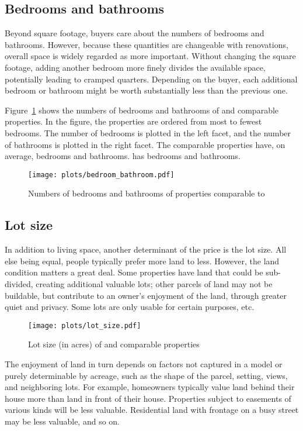 \documentclass[
12pt, %
letterpaper, %
oneside, %
headinclude,footinclude, %
BCOR5mm, %
]{scrartcl}
\begin{document}
\subsection{Bedrooms and bathrooms}
Beyond square footage, buyers care about the numbers of bedrooms and bathrooms.
However, because these quantities are changeable with renovations, overall space is widely regarded as more important.
Without changing the square footage, adding another bedroom more finely divides the available space, potentially leading to cramped quarters. 
Depending on the buyer, each additional bedroom or bathroom might be worth substantially less than the previous one.

Figure~\ref{fig:bedroom_bathroom} shows the numbers of bedrooms and bathrooms of \PropertyName{} and comparable properties. 
In the figure, the properties are ordered from most to fewest bedrooms.
The number of bedrooms is plotted in the left facet, and the number of bathrooms is plotted in the right facet. 
The comparable properties have, on average, \AverageBedrooms{} bedrooms and \AverageBaths{} bathrooms.
\PropertyName{} has bedrooms \NumberOfBedrooms{} and \NumberOfBaths{} bathrooms.

\begin{figure}[!]
\centering
\caption{Numbers of bedrooms and bathrooms of properties comparable to \PropertyName{}} \label{fig:bedroom_bathroom}  
\texttt{[image: plots/bedroom\_bathroom.pdf]} 
\end{figure}

\subsection{Lot size}
In addition to living space, another determinant of the price is the lot size.
All else being equal, people typically prefer more land to less.
However, the land condition matters a great deal. Some properties have land that could be sub-divided, creating additional valuable lots; other parcels of land may not be buildable, but contribute to an owner’s enjoyment of the land, through greater quiet
and privacy. Some lots are only usable for certain purposes, etc.

\begin{figure}[!]
\centering
\caption{Lot size (in acres) of \PropertyName{} and comparable properties} \label{fig:lot_size}  
\texttt{[image: plots/lot\_size.pdf]} 
\end{figure}

The enjoyment of land in turn depends on factors not captured in a model or purely determinable by acreage, such as the shape of the parcel, setting, views, and neighboring lots.
For example, homeowners typically value land behind their house more than land in front of their house. 
Properties subject to easements of various kinds will be less valuable.
Residential land with frontage on a busy street may be less valuable, and so on.
\end{document}
